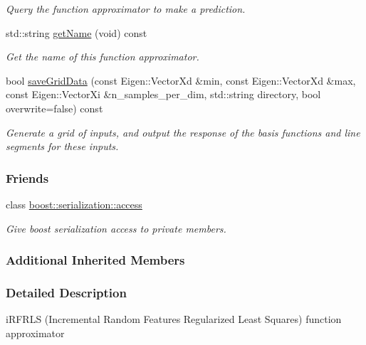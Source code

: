 \begin{DoxyCompactItemize}
\begin{DoxyCompactList}\small\item\em Query the function approximator to make a prediction. \end{DoxyCompactList}\item 
std\+::string \hyperlink{classDmpBbo_1_1FunctionApproximatorIRFRLS_ad4c95407e44ba3e16b9651f9b81cd0e6}{get\+Name} (void) const 
\begin{DoxyCompactList}\small\item\em Get the name of this function approximator. \end{DoxyCompactList}\item 
bool \hyperlink{classDmpBbo_1_1FunctionApproximatorIRFRLS_a53d95f63de3b49491b1204f45a24ae25}{save\+Grid\+Data} (const Eigen\+::\+Vector\+Xd \&min, const Eigen\+::\+Vector\+Xd \&max, const Eigen\+::\+Vector\+Xi \&n\+\_\+samples\+\_\+per\+\_\+dim, std\+::string directory, bool overwrite=false) const 
\begin{DoxyCompactList}\small\item\em Generate a grid of inputs, and output the response of the basis functions and line segments for these inputs. \end{DoxyCompactList}\end{DoxyCompactItemize}
\subsubsection*{Friends}
\begin{DoxyCompactItemize}
\item 
class \hyperlink{classDmpBbo_1_1FunctionApproximatorIRFRLS_ac98d07dd8f7b70e16ccb9a01abf56b9c}{boost\+::serialization\+::access}
\begin{DoxyCompactList}\small\item\em Give boost serialization access to private members. \end{DoxyCompactList}\end{DoxyCompactItemize}
\subsubsection*{Additional Inherited Members}


\subsubsection{Detailed Description}
i\+R\+F\+R\+L\+S (Incremental Random Features Regularized Least Squares) function approximator 

